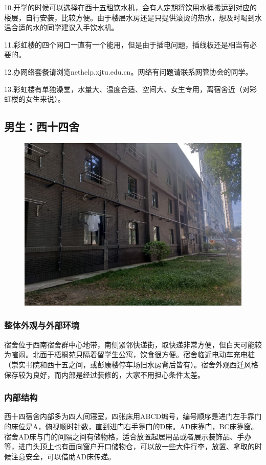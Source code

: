 \documentclass[
decoration,  %
]{qyxf-book}
\begin{document}
	10.开学的时候可以选择在西十五租饮水机，会有人定期将饮用水桶搬运到对应的楼层，自行安装，比较方便。由于楼层水房还是只提供滚烫的热水，想及时喝到水温合适的水的同学建议入手饮水机。
	
	11.彩虹楼的四个网口一直有一个能用，但是由于插电问题，插线板还是相当有必要的。
	
	12.办网络套餐请浏览nethelp.xjtu.edu.cn。网络有问题请联系网管协会的同学。
	
	13.彩虹楼有单独澡堂，水量大、温度合适、空间大、女生专用，离宿舍近（对彩虹楼的女生来说）。
	
	\subsection{男生：西十四舍}
	
	\begin{figure}[!h]
		\centering
		\includegraphics[width=0.8\linewidth]{pics/chp2_west10_dorm}
	\end{figure}
	
	\subsubsection{整体外观与外部环境}
	宿舍位于西南宿舍群中心地带，南侧紧邻快递街，取快递非常方便，但白天可能较为喧闹。北面于梧桐苑只隔着留学生公寓，饮食很方便。宿舍临近电动车充电桩（崇实书院和西十五之间，或彭康楼停车场旧水房背后皆有）。宿舍外观西迁风格保存较为良好，而内部是经过装修的，大家不用担心条件太差。
	
	\subsubsection{内部结构}
		
	西十四宿舍内部多为四人间寝室，四张床用ABCD编号，编号顺序是进门左手靠门的床位是A，俯视顺时针数，直到进门右手靠门的D床。AD床靠门，BC床靠窗。宿舍AD床与门的间隔之间有储物格，适合放置起居用品或者展示装饰品、手办等，进门头顶上也有面向窗户开口储物仓，可以放一些大件行李，放置、拿取的时候注意安全，可以借助AD床传递。
\end{document}
